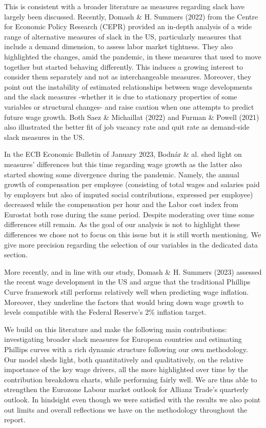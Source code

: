 This is consistent with a broader literature as measures regarding slack have largely been discussed. 
Recently, Domash \& H. Summers (2022)\cite{labour4} from the Centre for Economic Policy Research (CEPR) provided an in-depth analysis of a wide range of alternative measures of slack in the US, particularly measures that include a demand dimension, to assess labor market tightness. 
They also highlighted the changes, amid the pandemic, in these measures that used to move together but started behaving differently. 
This induces a growing interest to consider them separately and not as interchangeable measures. 
Moreover, they point out the instability of estimated relationships between wage developments and the slack measures -whether it is due to stationary properties of some variables or structural changes- and raise caution when one attempts to predict future wage growth. 
Both Saez \& Michaillat (2022)\cite{labour5} and Furman \& Powell (2021)\cite{labour6} also illustrated the better fit of job vacancy rate and quit rate as demand-side slack measures in the US.

In the ECB Economic Bulletin of January 2023, Bodnár \& al.\cite{labour7} shed light on measures’ differences but this time regarding wage growth as the latter also started showing some divergence during the pandemic. 
Namely, the annual growth of compensation per employee (consisting of total wages and salaries paid by employers but also of imputed social contributions, expressed per employee) decreased while the compensation per hour and the Labor cost index from Eurostat both rose during the same period. 
Despite moderating over time some differences still remain. 
As the goal of our analysis is not to highlight these differences we chose not to focus on this issue but it is still worth mentioning. 
We give more precision regarding the selection of our variables in the dedicated data section.

More recently, and in line with our study, Domash \& H. Summers (2023)\cite{labour8} assessed the recent wage development in the US and argue that the traditional Phillips Curve framework still performs relatively well when predicting wage inflation. 
Moreover, they underline the factors that would bring down wage growth to levels compatible with the Federal Reserve’s 2\% inflation target.

We build on this literature and make the following main contributions: investigating broader slack measures for European countries and estimating Phillips curves with a rich dynamic structure following our own methodology. 
Our model sheds light, both quantitatively and qualitatively, on the relative importance of the key wage drivers, all the more highlighted over time by the contribution breakdown charts, while performing fairly well. 
We are thus able to strengthen the Eurozone Labour market outlook for Allianz Trade’s quarterly outlook. 
In hindsight even though we were satisfied with the results we also point out limits and overall reflections we have on the methodology throughout the report.
